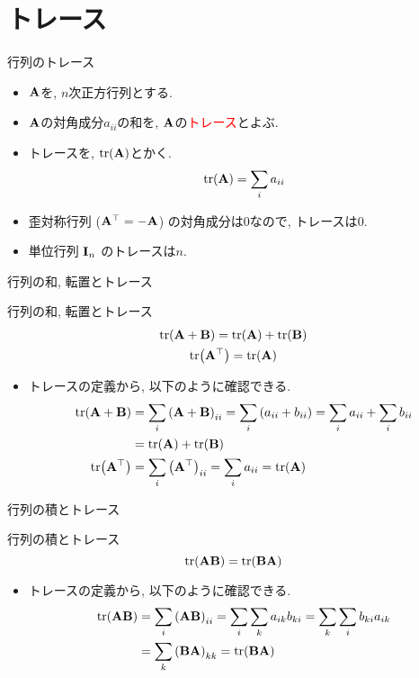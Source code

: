 \documentclass[dvipdfmx,notheorems,t]{beamer}
\begin{document}
\section{トレース}

\begin{frame}{行列のトレース}
\begin{itemize}
  \item $\vb{A}$を, $n$次正方行列とする.
  \item $\vb{A}$の対角成分$a_{ii}$の和を, $\vb{A}$の\textcolor{red}{トレース}とよぶ.
  \item トレースを, $\tr(\vb{A})$とかく.
  $$\tr(\vb{A}) = \sum_i a_{ii}$$
  \item 歪対称行列 ($\vb{A}^\top = -\vb{A}$) の対角成分は$0$なので, トレースは$0$.
  \item 単位行列 $\vb{I}_n$ のトレースは$n$.
\end{itemize}
\end{frame}

\begin{frame}{行列の和, 転置とトレース}
\begin{block}{行列の和, 転置とトレース}
  \begin{gather*}
    \tr(\vb{A} + \vb{B}) = \tr(\vb{A}) + \tr(\vb{B}) \\
    \tr(\vb{A}^\top) = \tr(\vb{A})
  \end{gather*}
\end{block}

\begin{itemize}
  \item トレースの定義から, 以下のように確認できる.
  \begin{align*}
    \tr(\vb{A} + \vb{B}) &= \sum_i \left( \vb{A} + \vb{B} \right)_{ii}
      = \sum_i \left( a_{ii} + b_{ii} \right) = \sum_i a_{ii} + \sum_i b_{ii} \\
      &= \tr(\vb{A}) + \tr(\vb{B}) \\
    \tr(\vb{A}^\top) &= \sum_i \left( \vb{A}^\top \right)_{ii}
      = \sum_i a_{ii} = \tr(\vb{A})
  \end{align*}
\end{itemize}
\end{frame}

\begin{frame}{行列の積とトレース}
\begin{block}{行列の積とトレース}
  $$\tr(\vb{A} \vb{B}) = \tr(\vb{B} \vb{A})$$
\end{block}

\begin{itemize}
  \item トレースの定義から, 以下のように確認できる.
  \begin{align*}
    \tr(\vb{A} \vb{B}) &= \sum_i \left( \vb{A} \vb{B} \right)_{ii}
      = \sum_i \sum_k a_{ik} b_{ki}
      = \sum_k \sum_i b_{ki} a_{ik} \\
      &= \sum_k \left( \vb{B} \vb{A} \right)_{kk}
      = \tr(\vb{B} \vb{A})
  \end{align*}
\end{itemize}
\end{frame}
\end{document}
